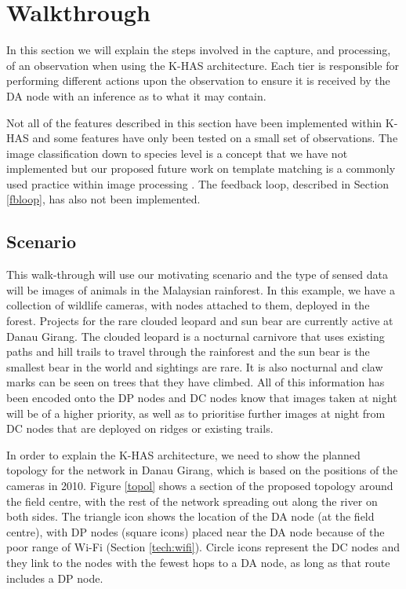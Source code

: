 	
	\section{Walkthrough}\label{arch:walk}
		In this section we will explain the steps involved in the capture, and processing, of an observation when using the K-HAS architecture. Each tier is responsible for performing different actions upon the observation to ensure it is received by the DA node with an inference as to what it may contain.
		
		Not all of the features described in this section have been implemented within K-HAS and some features have only been tested on a small set of observations. The image classification down to species level is a concept that we have not implemented but our proposed future work on template matching is a commonly used practice within image processing \cite{fast1995}. The feedback loop, described in Section \ref{fbloop}, has also not been implemented.

		\subsection{Scenario}\label{arch:scen}
			This walk-through will use our motivating scenario and the type of sensed data will be images of animals in the Malaysian rainforest. In this example, we have a collection of wildlife cameras, with nodes attached to them, deployed in the forest. Projects for the rare clouded leopard and sun bear are currently active at Danau Girang. The clouded leopard is a nocturnal carnivore that uses existing paths and hill trails to travel through the rainforest and the sun bear is the smallest bear in the world and sightings are rare. It is also nocturnal and claw marks can be seen on trees that they have climbed. All of this information has been encoded onto the DP nodes and DC nodes know that images taken at night will be of a higher priority, as well as to prioritise further images at night from DC nodes that are deployed on ridges or existing trails.

			In order to explain the K-HAS architecture, we need to show the planned topology for the network in Danau Girang, which is based on the positions of the cameras in 2010. Figure \ref{topol} shows a section of the proposed topology around the field centre, with the rest of the network spreading out along the river on both sides. The triangle icon shows the location of the DA node (at the field centre), with DP nodes (square icons) placed near the DA node because of the poor range of Wi-Fi (Section \ref{tech:wifi}). Circle icons represent the DC nodes and they link to the nodes with the fewest hops to a DA node, as long as that route includes a DP node. 


